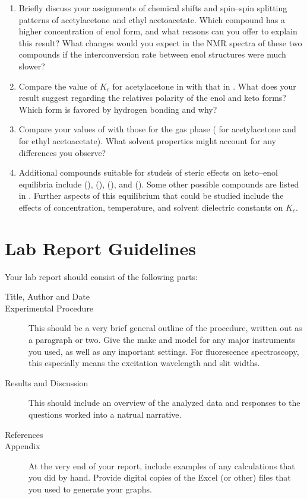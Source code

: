 \documentclass[nobib,nofonts,nols,nohyper]{tufte-handout}
\begin{document}
\begin{enumerate}
	\item Briefly discuss your assignments of chemical shifts and spin--spin splitting patterns of acetylacetone and ethyl acetoacetate. 
	Which compound has a higher concentration of enol form, and what reasons can you offer to explain this result?
	What changes would you expect in the NMR spectra of these two compounds if the interconversion rate between enol structures were much slower?
	\item Compare the value of \( K_c \) for acetylacetone in  with that in . 
	What does your result suggest regarding the relatives polarity of the enol and keto forms?
	Which form is favored by hydrogen bonding and why?
	\item Compare your values of  with those for the gas phase ( for acetylacetone and  for ethyl acetoacetate).\autocite{folkendt1985a}
	What solvent properties might account for any differences you observe?
	\item Additional compounds suitable for studeis of steric effects on keto--enol equilibria include  (),  (),  (), and  ().
	Some other possible compounds are listed in \textcite{burdett1964a,rogers1956a}. Further aspects of this equilibrium that could be studied include the effects of concentration, temperature, and solvent dielectric constants on \( K_c \).\autocite{rogers1956a}
\end{enumerate}


\section{Lab Report Guidelines} %
\label{sec:lab_report_guidelines}

Your lab report should consist of the following parts:
\begin{description}
	\item[Title, Author and Date]
	\item[Experimental Procedure] This should be a very brief general outline of the procedure, written out as a paragraph or two. Give the make and model for any major instruments you used, as well as any important settings. For fluorescence spectroscopy, this especially means the excitation wavelength and slit widths.
	\item[Results and Discussion] This should include an overview of the analyzed data and responses to the questions worked into a natrual narrative.
	\item[References]
	\item[Appendix] At the very end of your report, include examples of any calculations that you did by hand. 
	Provide digital copies of the Excel (or other) files that you used to generate your graphs.
\end{description}
\end{document}
